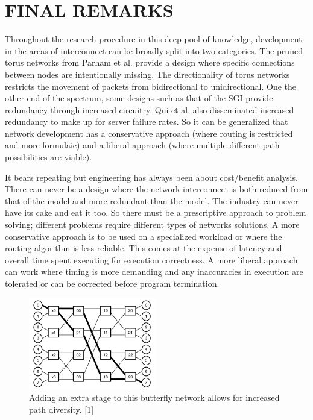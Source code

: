 \documentclass[letterpaper, 10 pt, conference]{ieeeconf}
\begin{document}
\section{FINAL REMARKS}

Throughout the research procedure in this deep pool of knowledge, development in the areas of interconnect can be broadly split into two categories.  The pruned torus networks from Parham et al. provide a design where specific connections between nodes are intentionally missing.  The directionality of torus networks restricts the movement of packets from bidirectional to unidirectional.  One the other end of the spectrum, some designs such as that of the SGI provide redundancy through increased circuitry.  Qui et al. also disseminated increased redundancy to make up for server failure rates.  So it can be generalized that network development has a conservative approach (where routing is restricted and more formulaic)  and a liberal approach (where multiple different path possibilities are viable).

It bears repeating but engineering has always been about cost/benefit analysis.  There can never be a design where the network interconnect is both reduced from that of the model and more redundant than the model.  The industry can never have its cake and eat it too.  So there must be a prescriptive approach to problem solving; different problems require different types of networks solutions.  A more conservative approach is to be used  on a specialized workload or where the routing algorithm is less reliable.  This comes at the expense of latency and overall time spent executing for execution correctness.  A more liberal approach can work where timing is more demanding and any inaccuracies in execution are tolerated or can be corrected before program termination.

\begin{figure}[!ht] %
	\centering
	\includegraphics [width=0.5\textwidth] {Extra_Fly.png} 
    \caption{Adding an extra stage to this butterfly network allows for increased path diversity. [1]}
\end{figure}
\end{document}
